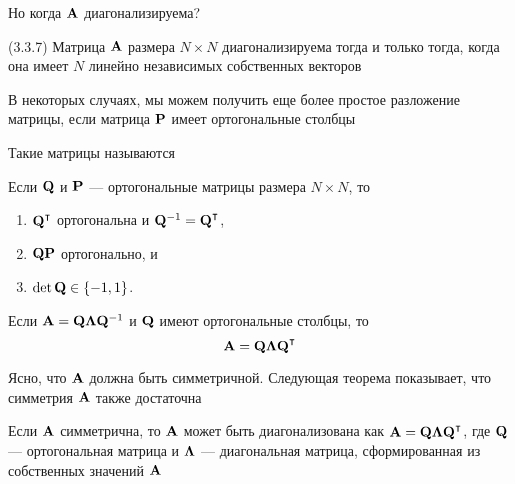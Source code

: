 \begin{frame}
    
    \vspace{2em}
    Но когда $\mathbf A$ диагонализируема?
    
    \vspace{.7em}
    \Fact (3.3.7)
    Матрица $\mathbf A$ размера $N \times N$ диагонализируема тогда и только тогда, когда
    она имеет $N$ линейно независимых собственных векторов

\end{frame}


\begin{frame}

     \vspace{2em}
    В некоторых случаях, мы можем получить еще более простое разложение матрицы, если 
    матрица $\mathbf P$ имеет ортогональные столбцы

    Такие матрицы называются 
    
    \vspace{.7em}
    \Fact{\eqref{ET-fa:orthmat}}
    Если $\mathbf Q$ и $\mathbf P$ --- ортогональные матрицы размера $N \times N$, то 
    \begin{enumerate}
        \item $\boldQ^\T$ ортогональна и $\boldQ^{-1} = \boldQ^\T$,
        \item $\mathbf Q \mathbf P$ ортогонально, и
        \item $\det \mathbf Q \in \{-1, 1\}$.
    \end{enumerate}
    
\end{frame}
    
\begin{frame}

    \vspace{2em}
    Если $\mathbf A = \mathbf Q {\boldsymbol \Lambda} \mathbf Q^{-1}$ и $\mathbf Q$ имеют ортогональные столбцы,
    то $$\boldA = \boldQ \boldLambda \boldQ^\T$$
    
    Ясно, что $\mathbf A$ должна быть симметричной. Следующая теорема показывает, что симметрия $\mathbf A$ также достаточна
    
    \vspace{.7em}
    \Thm{\eqref{ET-t:dismat}}
    Если $\mathbf A$ симметрична, то $\mathbf A$ может быть
    диагонализована как $\boldA = \boldQ \boldLambda \boldQ^\T$, где 
    $\mathbf Q$ --- ортогональная матрица и ${\boldsymbol \Lambda}$ ---
    диагональная матрица, сформированная из собственных значений $\mathbf A$
    
\end{frame}

